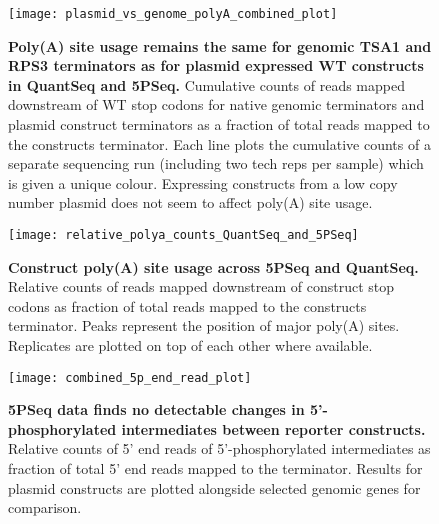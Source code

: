 \documentclass[../main.tex]{subfiles}
\begin{document}
\begin{figure}[ph!]

{\centering \texttt{[image: plasmid\_vs\_genome\_polyA\_combined\_plot]} 

}

\caption[Poly(A) site usage remains the same for genomic TSA1 and RPS3 terminators as for plasmid expressed WT constructs in QuantSeq and 5PSeq.]{\textbf{Poly(A) site usage remains the same for genomic TSA1 and RPS3 terminators as for plasmid expressed WT constructs in QuantSeq and 5PSeq.} Cumulative counts of reads mapped downstream of WT stop codons for native genomic terminators and plasmid construct terminators as a fraction of total reads mapped to the constructs terminator. Each line plots the cumulative counts of a separate sequencing run (including two tech reps per sample) which is given a unique colour. Expressing constructs from a low copy number plasmid does not seem to affect poly(A) site usage.}\label{fig:rnaseq-QC-genomic-vs-plasmid-polyA}
\end{figure}

\begin{figure}[p]

{\centering \texttt{[image: relative\_polya\_counts\_QuantSeq\_and\_5PSeq]} 

}

\caption[Construct poly(A) site usage across 5PSeq and QuantSeq.]{\textbf{Construct poly(A) site usage across 5PSeq and QuantSeq.} Relative counts of reads mapped downstream of construct stop codons as fraction of total reads mapped to the constructs terminator. Peaks represent the position of major poly(A) sites. Replicates are plotted on top of each other where available.}\label{fig:relative-polya-counts}
\end{figure}

\begin{figure}[ph!]

{\centering \texttt{[image: combined\_5p\_end\_read\_plot]} 

}

\caption[5PSeq data finds no detectable changes in 5'-phosphorylated intermediates between reporter constructs.]{\textbf{5PSeq data finds no detectable changes in 5'-phosphorylated intermediates between reporter constructs.} Relative counts of 5' end reads of 5'-phosphorylated intermediates as fraction of total 5' end reads mapped to the terminator. Results for plasmid constructs are plotted alongside selected genomic genes for comparison.}\label{fig:combined-5p-end-read-plot}
\end{figure}
\end{document}
